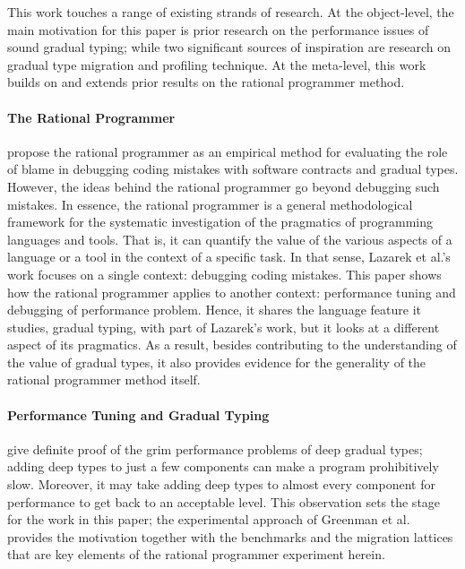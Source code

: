 

This work touches a range of existing strands of research. At
the object-level, the main motivation for this paper is prior research on
the performance issues of sound gradual typing; while two significant
sources of inspiration are research on gradual type migration and
profiling technique.  At the meta-level, this work builds on and extends
prior results on the rational programmer method.   

\paragraph{The Rational Programmer}

 \citet{lksfd-popl-2020,lgfd-icfp-2021} propose the rational programmer as
 an empirical method for evaluating the role of blame in debugging coding
 mistakes with software contracts and gradual types. However, the ideas
 behind the rational programmer go beyond debugging such mistakes. In
 essence, the rational programmer is a general methodological framework
 for the systematic investigation of the pragmatics of programming
 languages and tools. That is, it can quantify the value of the various
 aspects of a language or a tool in the context of a specific task. In
 that sense, Lazarek et al.'s work focuses on a single context: debugging
 coding mistakes. This paper shows how the rational programmer applies
 to another context: performance tuning and debugging of performance
 problem. Hence, it shares the language feature it studies, gradual
 typing, with part of Lazarek's work, but it looks at a different aspect
 of its pragmatics. As a result, besides contributing to the understanding
 of the value of gradual types, it also provides evidence for the
 generality of the rational programmer method itself.  

\paragraph{Performance Tuning and Gradual Typing} 

\citet{gtnffvf-jfp-2019} give definite proof of the grim performance
problems of deep gradual types; adding deep types to just a few components
can make a program prohibitively slow. Moreover, it may take adding deep
types to almost every component for performance to get back to an
acceptable level. This observation sets the stage for the work in this
paper; the experimental approach of Greenman et al. provides the
motivation together with the benchmarks and the migration lattices that
are key elements of the rational programmer experiment herein.  

